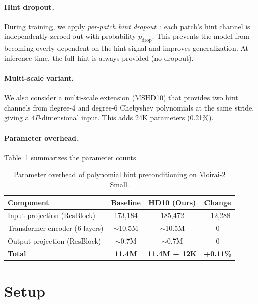 \documentclass[11pt]{article}
\begin{document}
\paragraph{Hint dropout.} During training, we apply \emph{per-patch hint dropout}~\citep{srivastava2014dropout}: each patch's hint channel is independently zeroed out with probability $p_{\text{drop}}$. This prevents the model from becoming overly dependent on the hint signal and improves generalization. At inference time, the full hint is always provided (no dropout).

\paragraph{Multi-scale variant.} We also consider a multi-scale extension (MSHD10) that provides two hint channels from degree-4 and degree-6 Chebyshev polynomials at the same stride, giving a $4P$-dimensional input. This adds 24K parameters (0.21\%).

\paragraph{Parameter overhead.} Table~\ref{tab:params} summarizes the parameter counts.

\begin{table}[t]
\centering
\caption{Parameter overhead of polynomial hint preconditioning on Moirai-2 Small.}
\label{tab:params}
\small
\begin{tabular}{lccc}
\toprule
\textbf{Component} & \textbf{Baseline} & \textbf{HD10 (Ours)} & \textbf{Change} \\
\midrule
Input projection (ResBlock) & 173,184 & 185,472 & +12,288 \\
Transformer encoder (6 layers) & $\sim$10.5M & $\sim$10.5M & 0 \\
Output projection (ResBlock) & $\sim$0.7M & $\sim$0.7M & 0 \\
\midrule
\textbf{Total} & \textbf{11.4M} & \textbf{11.4M + 12K} & \textbf{+0.11\%} \\
\bottomrule
\end{tabular}
\end{table}

\section{Setup}
\end{document}

